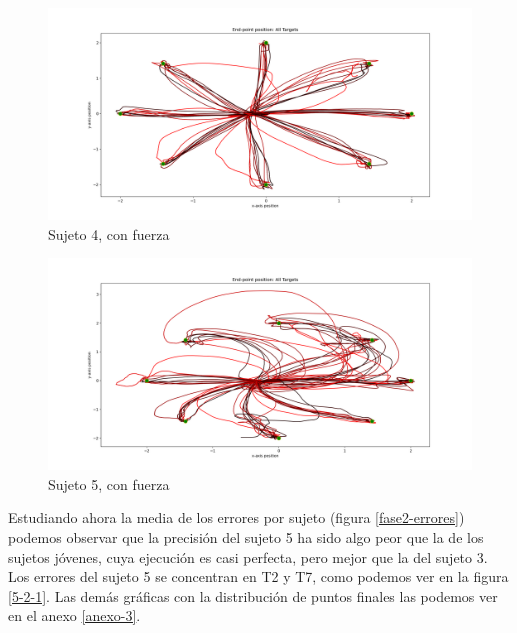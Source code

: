 \documentclass[a4paper,11pt, oneside]{book}
\begin{document}
\begin{figure}[H]
	\includegraphics[width=\linewidth]{sujeto4/force/trayectorias}
	\caption{Sujeto 4, con fuerza}
	\label{4-2-0}
\end{figure}
\begin{figure}[H]
	\includegraphics[width=\linewidth]{sujeto5/force/trayectorias}
	\caption{Sujeto 5, con fuerza}
	\label{5-2-0}
\end{figure}


Estudiando ahora la media de los errores por sujeto (figura \ref{fase2-errores}) podemos observar que la precisión del sujeto 5  ha sido algo peor que la de los sujetos jóvenes, cuya ejecución es casi perfecta, pero mejor que la del sujeto 3. Los errores del sujeto 5 se concentran en T2 y T7, como podemos ver en la figura \ref{5-2-1}. Las demás gráficas con la distribución de puntos finales las podemos ver en el anexo \ref{anexo-3}.
\end{document}
